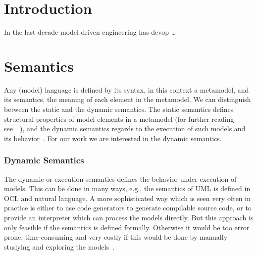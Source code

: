\documentclass{llncs}
\begin{document}
\tableofcontents
\newpage


\section{Introduction}
In the last decade model driven engineering has devop  \dots


\section{Semantics}
\label{sec:semantics}
Any (model) language is defined by its syntax, in this context a metamodel, and its semantics, the meaning of each element in the metamodel. We can distinguish between the static and the dynamic semantics. The static semantics defines structural properties of model elements in a metamodel (for further reading see~\cite{jour:10}~\cite{jour:3}), and the dynamic semantics regards to the execution of such models and its behavior~\cite{jour:3}. For our work we are interested in the dynamic semantics.

\subsubsection{Dynamic Semantics}
The dynamic or execution semantics defines the behavior under execution of models. This can be done in many ways, e.g., the semantics of UML is defined in OCL and natural language. A more sophisticated way which is seen very often in practice is either to use code generators to generate compilable source code, or to provide an interpreter which can process the models directly. But this approach is only feasible if the semantics is defined formally. Otherwise it would be too error prone, time-consuming and very costly if this would be done by manually studying and exploring the models~\cite{jour:3}.
\end{document}

